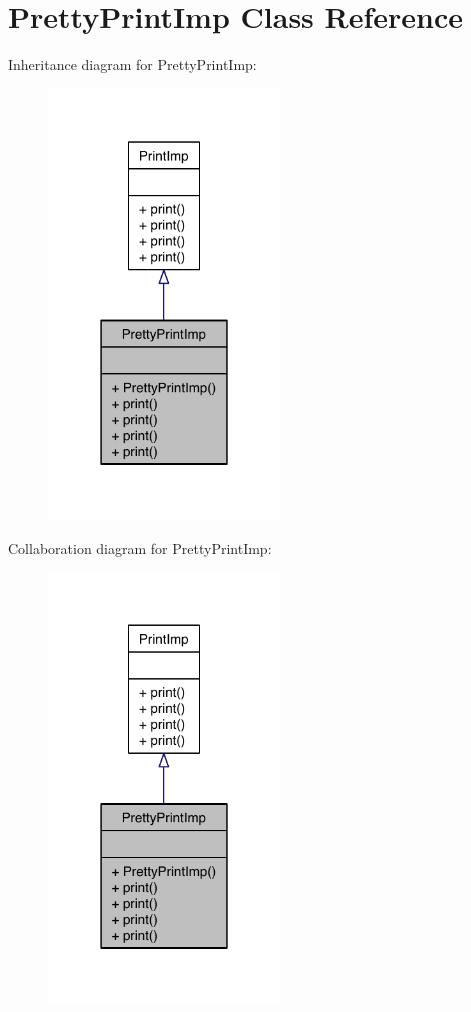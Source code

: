 \hypertarget{class_pretty_print_imp}{\section{Pretty\-Print\-Imp Class Reference}
\label{class_pretty_print_imp}
}


Inheritance diagram for Pretty\-Print\-Imp\-:\nopagebreak
\begin{figure}[H]
\begin{center}
\leavevmode
\includegraphics[width=174pt]{class_pretty_print_imp__inherit__graph}
\end{center}
\end{figure}


Collaboration diagram for Pretty\-Print\-Imp\-:\nopagebreak
\begin{figure}[H]
\begin{center}
\leavevmode
\includegraphics[width=174pt]{class_pretty_print_imp__coll__graph}
\end{center}
\end{figure}
